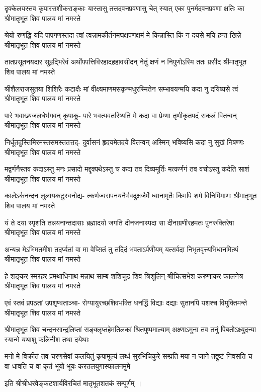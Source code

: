 \fourlineindentedshloka
{दृक्केलयस्तव कृपारसशीकराङ्काः}
{यास्तासु तत्तदवनप्रवणासु चेत् स्यात्}
{एका पुनर्मदवनप्रवणा क्षतिः का}
{श्रीमातृभूत शिव पालय मां नमस्ते} %

\fourlineindentedshloka
{श्रेयो रुणद्धि यदि पापगणस्तदा त्वां}
{त्वन्नामकीर्तनमघक्षपणक्षमं मे}
{किन्नास्ति किं न दयसे मयि हन्त खिन्ने}
{श्रीमातृभूत शिव पालय मां नमस्ते} %

\fourlineindentedshloka
{तातप्रसूतनयदार सुहृद्भिरेवं}
{अर्थोपपत्तिविरहादहहावसीदन्}
{नेतुं क्षणं न निपुणोऽस्मि ततः प्रसीद}
{श्रीमातृभूत शिव पालय मां नमस्ते} %

\fourlineindentedshloka
{श्रीशैलराजसुतया शिशिरैः कटाक्षैः}
{मां वीक्ष्यमाणमसकृन्मधुरस्मितेन}
{सम्भावयन्मयि कदा नु दयिष्यसे त्वं}
{श्रीमातृभूत शिव पालय मां नमस्ते} %

\fourlineindentedshloka
{पारे भवाख्यजलधेर्भगवन् कृपाकू-}
{पारे भवत्यवतरिष्यति मे कदा वा}
{प्रेम्णा तृणीकृतपदं सकलं वितन्वन्}
{श्रीमातृभूत शिव पालय मां नमस्ते} %

\fourlineindentedshloka
{निर्धूतदुस्तिमिरमस्तसमस्ततत्तद्-}
{दुर्वासनं हृदयमेतदये वितन्वन्}
{अस्मिन् भविष्यसि कदा नु सुखं निषण्णः}
{श्रीमातृभूत शिव पालय मां नमस्ते} %

\fourlineindentedshloka
{मद्वर्णनैस्तव कदाऽस्तु मनः प्रसादो}
{मद्दृक्पथेऽस्तु च कदा तव दिव्यमूर्तिः}
{मत्कर्णगं तव वचोऽस्तु कदेति साशं}
{श्रीमातृभूत शिव पालय मां नमस्ते} %

\fourlineindentedshloka
{कालेऽर्कनन्दन लुलायकटुस्वनोद्य-}
{त्कर्णज्वरापनयनैर्भवदुक्षजैर्मे}
{ध्वानामृतैः किमपि शर्म विनिर्मिमाणः}
{श्रीमातृभूत शिव पालय मां नमस्ते} %

\fourlineindentedshloka
{यं ते दया स्पृशति तन्नयनान्तदासाः}
{ब्रह्मादयो जगति दीनजनास्पदा सा}
{दीनाग्रणीरहमतः पुनरुक्तिरेषा}
{श्रीमातृभूत शिव पालय मां नमस्ते} %

\fourlineindentedshloka
{अन्यन्न मेऽभिमतमीश तदर्प्यतां वा}
{मा वेप्सितं तु तदिदं भवताऽर्पणीयम्}
{यत्सर्वदा निभृतवृत्त्यभिधानमित्थं}
{श्रीमातृभूत शिव पालय मां नमस्ते} %

\fourlineindentedshloka
{हे शङ्कर स्मरहर प्रमथाधिनाथ}
{मन्नाथ साम्ब शशिचूड शिव त्रिशूलिन्}
{श्रीचित्सभेश करुणाकर फालनेत्र}
{श्रीमातृभूत शिव पालय मां नमस्ते} %

\fourlineindentedshloka
{एवं स्तवं प्रपठतां उपश‍ृण्वताञ्चा-}
{रोग्यायुरच्छशिवभक्ति धनर्द्धि विद्याः}
{दद्याः सुतानपि यशश्च विमुक्तिमन्ते}
{श्रीमातृभूत शिव पालय मां नमस्ते} %

\fourlineindentedshloka
{श्रीमातृभूत शिव चन्दनसान्द्रलिप्तां}
{सङ्क्लृप्तहेमतिलकां श्रितपुष्पमाल्याम्}
{अक्ष्णाऽमुना तव तनुं पिबतोऽक्ष्युदन्या}
{स्यान्मे यथाशु फलिनीश तथा दयेथाः} %

\fourlineindentedshloka
{मनो मे विक्रीतं तव चरणसेवां कलयितुं}
{कृपामूल्यं लब्धं सुरभिचिकुरे सम्प्रति मया}
{न जाने तद्दुष्टं निवसति च वा धावति च वा}
{कृतं भूयो भूयः करतलयुगास्फालनमुमे} %

इति श्रीश्रीधरवेङ्कटशार्यविरचितं मातृभूतशतकं सम्पूर्णम् ।